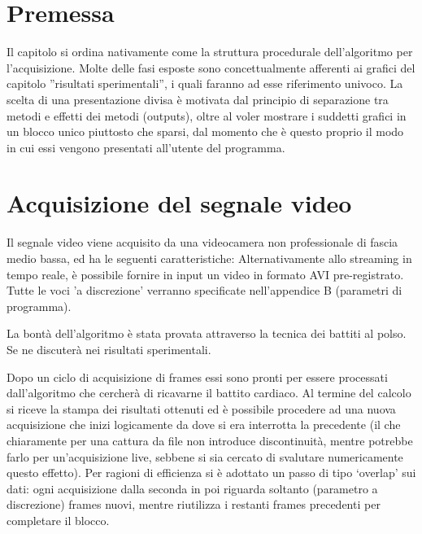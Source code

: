 \section{Premessa}
Il capitolo si ordina nativamente come la struttura procedurale dell'algoritmo per l'acquisizione. Molte delle fasi esposte sono concettualmente afferenti ai grafici del capitolo ''risultati sperimentali'', i quali faranno ad esse riferimento univoco. La scelta di una presentazione divisa è motivata dal principio di separazione tra metodi e effetti dei metodi (outputs), oltre al voler mostrare i suddetti grafici in un blocco unico piuttosto che sparsi, dal momento che è questo proprio il modo in cui essi vengono presentati all'utente del programma.
\section{Acquisizione del segnale video} %
Il segnale video viene acquisito da una videocamera non professionale di fascia medio bassa, ed ha le seguenti caratteristiche:
Alternativamente allo streaming in tempo reale, è possibile fornire in input un video in formato AVI pre-registrato. Tutte le voci 'a discrezione' verranno specificate nell'appendice B (parametri di programma).

La bontà dell'algoritmo è stata provata attraverso la tecnica dei battiti al polso. Se ne discuterà nei risultati sperimentali.

Dopo un ciclo di acquisizione di  frames essi sono pronti per essere processati dall'algoritmo che cercherà di ricavarne il battito cardiaco. Al termine del calcolo si riceve la stampa dei risultati ottenuti ed è possibile procedere ad una nuova acquisizione che inizi logicamente da dove si era interrotta la precedente (il che chiaramente per una cattura da file non introduce discontinuità, mentre potrebbe farlo per un'acquisizione live, sebbene si sia cercato di svalutare numericamente questo effetto). Per ragioni di efficienza si è adottato un passo di tipo `overlap' sui dati: ogni acquisizione dalla seconda in poi riguarda soltanto  (parametro a discrezione) frames nuovi, mentre riutilizza i restanti  frames precedenti per completare il blocco.
